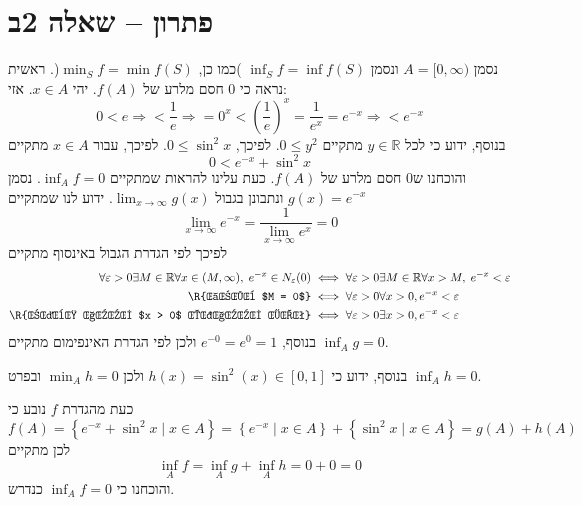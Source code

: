 \documentclass[11pt, oneside]{article}
\newcommand{\qed}{\R{$\blacksquare$}}
\newcommand{\br}{\\\\\\\\\\\\\\}
\newcommand{\logr}[1]{\Longrightarrow}
\newcommand{\mR}{\mathbb{R}}
\begin{document}
\section*{פתרון -- שאלה 2ב}
נסמן $A = [0, \infty)$ ונסמן $\inf_{S} f = \inf f(S)$ )כמו כן, $\min_{S} f = \min f(S)$(. ראשית נראה כי 0 חסם מלרע של $f(A)$. יהי $x \in A$. אזי:
\[
0 < e \logr 0 < \frac{1}{e} \logr 0 = 0^{x} < \left(\frac{1}{e}\right)^{x} = \frac{1}{e^{x}} = e^{-x} \logr 0 < e^{-x}
\]
בנוסף, ידוע כי לכל $y \in \mR$ מתקיים $0 \le y^{2}$. לפיכך, $0 \le \sin^{2}{x}$. לפיכך, עבור $x \in A$ מתקיים
\[
0 < e^{-x} + \sin^{2}{x}
\]
והוכחנו ש0 חסם מלרע של $f(A)$. כעת עלינו להראות שמתקיים $\inf_{A} f = 0$. נסמן $g(x) = e^{-x}$ ונתבונן בגבול $\lim_{x \to \infty} g(x)$. ידוע לנו שמתקיים
\[
\lim_{x \to \infty} e^{-x} = \frac{1}{\lim_{x \to \infty} e^{x}} = 0
\]
לפיכך לפי הגדרת הגבול באינסוף מתקיים
\begin{align*}
\forall \varepsilon > 0 \exists M \in \mR \forall x \in (M, \infty),\;e^{-x} \in N_{\varepsilon}(0)
&\iff \forall \varepsilon > 0 \exists M \in \mR \forall x > M,\;e^{-x} < \varepsilon\\
\text{\R{נבחר $M = 0$}} &\iff \forall \varepsilon > 0 \forall x > 0, e^{-x} < \varepsilon\\
\text{\R{בפרט קיים $x > 0$ המקיים זאת}} &\iff \forall \varepsilon > 0 \exists x > 0, e^{-x} < \varepsilon
\end{align*}
בנוסף, $e^{-0} = e^{0} = 1$ ולכן לפי הגדרת האינפימום מתקיים $\inf_{A} g = 0$.

בנוסף, ידוע כי $h(x) = \sin^{2}(x) \in [0, 1]$ ולכן $\min_{A} h = 0$ ובפרט $\inf_{A} h = 0$.

כעת מהגדרת $f$ נובע כי
\[
f(A) = \left\{ e^{-x} + \sin^{2}{x} \mid x \in A \right\} = \left\{ e^{-x} \mid x \in A \right\} + \left\{ \sin^{2}{x} \mid x \in A \right\} = g(A) + h(A)
\]
לכן מתקיים
\[
\inf_{A} f = \inf_{A} g + \inf_{A} h = 0 + 0 = 0
\]
 והוכחנו כי $\inf_{A} f = 0$ כנדרש.
\br\qed
\end{document}
